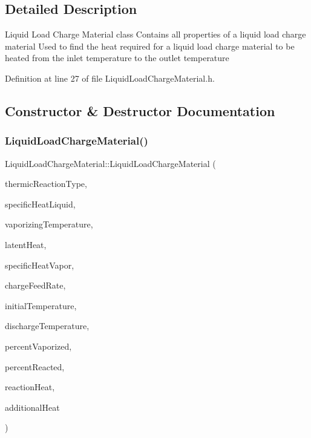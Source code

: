 \subsection{Detailed Description}
Liquid Load Charge Material class Contains all properties of a liquid load charge material Used to find the heat required for a liquid load charge material to be heated from the inlet temperature to the outlet temperature 

Definition at line 27 of file Liquid\+Load\+Charge\+Material.\+h.



\subsection{Constructor \& Destructor Documentation}
\mbox{\label{class_liquid_load_charge_material_ab6b2ef342701227c60dc380f5a576085}} 
\subsubsection{\texorpdfstring{Liquid\+Load\+Charge\+Material()}{LiquidLoadChargeMaterial()}\hspace{0.1cm}{\footnotesize\ttfamily [1/3]}}
{\footnotesize\ttfamily Liquid\+Load\+Charge\+Material\+::\+Liquid\+Load\+Charge\+Material (\begin{DoxyParamCaption}\item[{const \hyperlink{class_load_charge_material_a51d4263e865a5d86236622dd3fe23fd1}{Load\+Charge\+Material\+::\+Thermic\+Reaction\+Type}}]{thermic\+Reaction\+Type,  }\item[{const double}]{specific\+Heat\+Liquid,  }\item[{const double}]{vaporizing\+Temperature,  }\item[{const double}]{latent\+Heat,  }\item[{const double}]{specific\+Heat\+Vapor,  }\item[{const double}]{charge\+Feed\+Rate,  }\item[{const double}]{initial\+Temperature,  }\item[{const double}]{discharge\+Temperature,  }\item[{const double}]{percent\+Vaporized,  }\item[{const double}]{percent\+Reacted,  }\item[{const double}]{reaction\+Heat,  }\item[{const double}]{additional\+Heat }\end{DoxyParamCaption})\hspace{0.3cm}{\ttfamily [inline]}}

